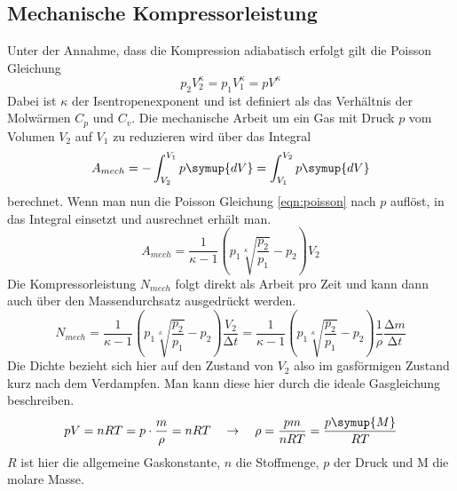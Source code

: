 \subsection{Mechanische Kompressorleistung}
Unter der Annahme, dass die Kompression adiabatisch erfolgt gilt die Poisson Gleichung
\begin{equation}
\label{eqn:poisson}
p_{2}V_{2}^{\kappa} = p_{1}V_{1}^{\kappa} = pV^{\kappa}
\end{equation}
Dabei ist $\kappa$ der Isentropenexponent und ist definiert als das Verhältnis der Molwärmen $C_{p}$ und $C_{v}$.
Die mechanische Arbeit um ein Gas mit Druck $p$ vom Volumen $V_{2}$ auf $V_{1}$ zu reduzieren wird über das Integral
\begin{equation}
A_{mech} = - \int_{V_{2}}^{V_{1}} p \symup{dV} = \int_{V_{1}}^{V_{2}} p \symup{dV}
\end{equation}
berechnet. Wenn man nun die Poisson Gleichung \eqref{eqn:poisson} nach $p$ auflöst, in das Integral einsetzt und ausrechnet erhält man.
\begin{equation}
A_{mech} = \frac{1}{\kappa - 1} \left( p_{1}\sqrt[\kappa]{\frac{p_{2}}{p_{1}}} - p_{2} \right) V_{2}
\end{equation}
Die Kompressorleistung $N_{mech}$ folgt direkt als Arbeit pro Zeit und kann dann auch über den Massendurchsatz ausgedrückt werden.
\begin{equation}
N_{mech} = \frac{1}{\kappa - 1} \left( p_{1}\sqrt[\kappa]{\frac{p_{2}}{p_{1}}} - p_{2} \right) \frac{V_{2}}{\increment t} = \frac{1}{\kappa - 1} \left( p_{1}\sqrt[\kappa]{\frac{p_{2}}{p_{1}}} - p_{2} \right) \frac{1}{\rho} \frac{\increment m}{\increment t}
\end{equation}
Die Dichte bezieht sich hier auf den Zustand von $V_{2}$ also im gasförmigen Zustand kurz nach dem Verdampfen. Man kann diese hier
durch die ideale Gasgleichung beschreiben.
\begin{equation}
\label{eqn:idealegasgl}
p V = nRT = p \cdot \frac{m}{\rho} = nRT \quad \to \quad \rho = \frac{pm}{nRT} = \frac{p \symup{M}}{RT}
\end{equation}
$R$ ist hier die allgemeine Gaskonstante, $n$ die Stoffmenge, $p$ der Druck und M die molare Masse.

